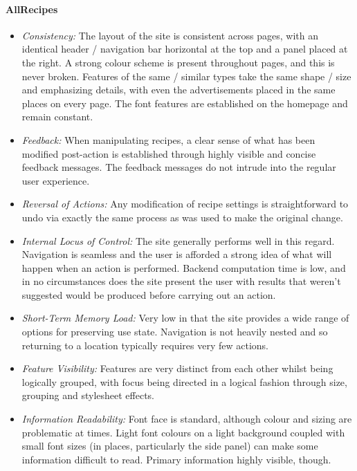 
\paragraph{AllRecipes}
\begin{itemize}
\item \emph{Consistency:} The layout of the site is consistent across pages, with an identical header / navigation bar horizontal at the top and a panel placed at the right. A strong colour scheme is present throughout pages, and this is never broken. Features of the same / similar types take the same shape / size and emphasizing details, with even the advertisements placed in the same places on every page. The font features are established on the homepage and remain constant.
\item \emph{Feedback:} When manipulating recipes, a clear sense of what has been modified post-action is established through highly visible and concise feedback messages. The feedback messages do not intrude into the regular user experience.
\item \emph{Reversal of Actions:} Any modification of recipe settings is straightforward to undo via exactly the same process as was used to make the original change.
\item \emph{Internal Locus of Control: }The site generally performs well in this regard. Navigation is seamless and the user is afforded a strong idea of what will happen when an action is performed. Backend computation time is low, and in no circumstances does the site present the user with results that weren't suggested would be produced before carrying out an action.
\item \emph{Short-Term Memory Load:} Very low in that the site provides a wide range of options for preserving use state. Navigation is not heavily nested and so returning to a location typically requires very few actions.
\item \emph{Feature Visibility:} Features are very distinct from each other whilst being logically grouped, with focus being directed in a logical fashion through size, grouping and stylesheet effects.
\item \emph{Information Readability:} Font face is standard, although colour and sizing are problematic at times. Light font colours on a light background coupled with small font sizes (in places, particularly the side panel) can make some information difficult to read. Primary information highly visible, though.
\end{itemize}

